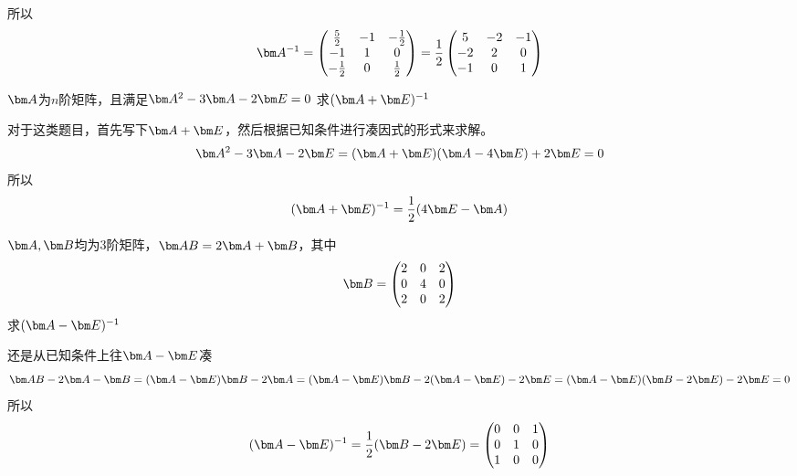 \begin{solution}
    所以
    \[
        \mat{A}^{-1} =
        \begin{pmatrix}
            \frac{5}{2}  & -1 & -\frac{1}{2} \\
            -1           & 1  & 0            \\
            -\frac{1}{2} & 0  & \frac{1}{2}
        \end{pmatrix}
        =\frac{1}{2}
        \begin{pmatrix}
            5  & -2 & -1 \\
            -2 & 2  & 0  \\
            -1 & 0  & 1
        \end{pmatrix}
    \]
\end{solution}

\begin{example}
    $\mat{A}$为$n$阶矩阵，且满足$\mat{A}^2 - 3\mat{A} - 2\mat{E} =0$
    求$(\mat{A}+\mat{E})^{-1}$
\end{example}
\begin{solution}
    对于这类题目，首先写下$\mat{A}+\mat{E}$，然后根据已知条件进行凑因式的形式来求解。
    \[ \mat{A}^2 - 3\mat{A} - 2\mat{E} = (\mat{A}+\mat{E})(\mat{A} - 4\mat{E}) + 2\mat{E} = 0 \]
    所以
    \[ (\mat{A}+\mat{E})^{-1} = \frac{1}{2}(4\mat{E}-\mat{A}) \]
\end{solution}
\begin{example}
    $\mat{A},\mat{B}$均为$3$阶矩阵，$\mat{AB}=2\mat{A}+\mat{B}$，其中
    \[
        \mat{B} =
        \begin{pmatrix}
            2 & 0 & 2 \\
            0 & 4 & 0 \\
            2 & 0 & 2
        \end{pmatrix}
    \]
    求$(\mat{A}-\mat{E})^{-1}$
\end{example}
\begin{solution}
    还是从已知条件上往$\mat{A}-\mat{E}$凑
    \[ \mat{AB} - 2\mat{A} - \mat{B} =(\mat{A}-\mat{E})\mat{B} - 2\mat{A} = (\mat{A}-\mat{E})\mat{B} - 2(\mat{A}-\mat{E}) - 2\mat{E} = (\mat{A}-\mat{E})(\mat{B}-2\mat{E}) - 2\mat{E} = 0  \]
    所以
    \[
        (\mat{A}-\mat{E})^{-1} = \frac{1}{2}(\mat{B}-2\mat{E}) =
        \begin{pmatrix}
            0 & 0 & 1 \\
            0 & 1 & 0 \\
            1 & 0 & 0
        \end{pmatrix}
    \]
\end{solution}
